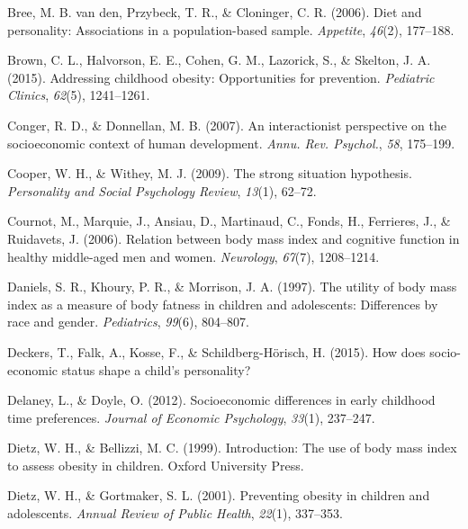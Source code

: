 \documentclass[man]{apa6}
\begin{document}
\leavevmode\hypertarget{ref-van2006diet}{}%
Bree, M. B. van den, Przybeck, T. R., \& Cloninger, C. R. (2006). Diet and personality: Associations in a population-based sample. \emph{Appetite}, \emph{46}(2), 177--188.

\leavevmode\hypertarget{ref-brown2015addressing}{}%
Brown, C. L., Halvorson, E. E., Cohen, G. M., Lazorick, S., \& Skelton, J. A. (2015). Addressing childhood obesity: Opportunities for prevention. \emph{Pediatric Clinics}, \emph{62}(5), 1241--1261.

\leavevmode\hypertarget{ref-conger2007interactionist}{}%
Conger, R. D., \& Donnellan, M. B. (2007). An interactionist perspective on the socioeconomic context of human development. \emph{Annu. Rev. Psychol.}, \emph{58}, 175--199.

\leavevmode\hypertarget{ref-cooper2009strong}{}%
Cooper, W. H., \& Withey, M. J. (2009). The strong situation hypothesis. \emph{Personality and Social Psychology Review}, \emph{13}(1), 62--72.

\leavevmode\hypertarget{ref-cournot2006relation}{}%
Cournot, M., Marquie, J., Ansiau, D., Martinaud, C., Fonds, H., Ferrieres, J., \& Ruidavets, J. (2006). Relation between body mass index and cognitive function in healthy middle-aged men and women. \emph{Neurology}, \emph{67}(7), 1208--1214.

\leavevmode\hypertarget{ref-daniels1997utility}{}%
Daniels, S. R., Khoury, P. R., \& Morrison, J. A. (1997). The utility of body mass index as a measure of body fatness in children and adolescents: Differences by race and gender. \emph{Pediatrics}, \emph{99}(6), 804--807.

\leavevmode\hypertarget{ref-deckers2015does}{}%
Deckers, T., Falk, A., Kosse, F., \& Schildberg-Hörisch, H. (2015). How does socio-economic status shape a child's personality?

\leavevmode\hypertarget{ref-delaney2012socioeconomic}{}%
Delaney, L., \& Doyle, O. (2012). Socioeconomic differences in early childhood time preferences. \emph{Journal of Economic Psychology}, \emph{33}(1), 237--247.

\leavevmode\hypertarget{ref-dietz1999introduction}{}%
Dietz, W. H., \& Bellizzi, M. C. (1999). Introduction: The use of body mass index to assess obesity in children. Oxford University Press.

\leavevmode\hypertarget{ref-dietz2001preventing}{}%
Dietz, W. H., \& Gortmaker, S. L. (2001). Preventing obesity in children and adolescents. \emph{Annual Review of Public Health}, \emph{22}(1), 337--353.
\end{document}
